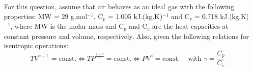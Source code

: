\documentclass[calculator,steamtables,refrigeranttables,psychrometricchart,datasheet]{exam}
\newcommand{\frc}{\displaystyle\frac}
\begin{document}
\begin{question}
\begin{enumerate}[(a)]
\begin{enumerate}[(i)]
{}
%
\end{enumerate}

\end{enumerate}
For this question, assume that air behaves as an ideal gas with the following properties: MW = 29 g.mol$^{-1}$, C$_{p}$ = 1.005 kJ.(kg.K)$^{-1}$ and C$_{v}$ = 0.718 kJ.(kg.K)$^{-1}$, where MW is the molar mass and C$_{p}$ and C$_{v}$ are the heat capacities at constant pressure and volume, respectively. Also, given the following relations for isentropic operations:%
\begin{displaymath}
TV^{\gamma-1}=\text{const.} \Leftrightarrow TP^{\frac{1-\gamma}{\gamma}}=\text{const.} \Leftrightarrow PV^{\gamma}=\text{const.} \;\;\;\text{ with } \gamma = \frc{C_{p}}{C_{v}}
\end{displaymath}

\end{question}

\clearpage
\end{document}
